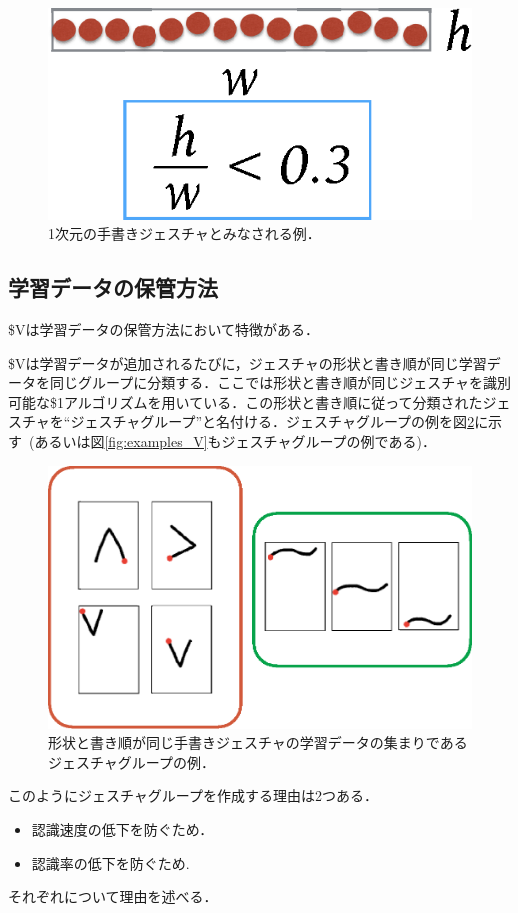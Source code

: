 \begin{figure} [h!]
	\begin{center}
		\includegraphics [width=0.3\hsize ]{img/1D.eps}
	\end{center}
	\caption{1次元の手書きジェスチャとみなされる例．}
	\label{fig:1D}
\end{figure}


\subsection{学習データの保管方法}
\$Vは学習データの保管方法において特徴がある．

\$Vは学習データが追加されるたびに，ジェスチャの形状と書き順が同じ学習データを同じグループに分類する．ここでは形状と書き順が同じジェスチャを識別可能な\$1アルゴリズムを用いている．この形状と書き順に従って分類されたジェスチャを``ジェスチャグループ''と名付ける．ジェスチャグループの例を図\ref{fig:gesture_group}に示す~(あるいは図\ref{fig:examples_V}もジェスチャグループの例である)．

\begin{figure} [h!]
	\begin{center}
		\includegraphics [width=0.55\hsize ]{img/gesture_group.eps}
	\end{center}
	\caption{形状と書き順が同じ手書きジェスチャの学習データの集まりであるジェスチャグループの例．}
	\label{fig:gesture_group}
\end{figure}

このようにジェスチャグループを作成する理由は2つある．
\begin{itemize}
\item 認識速度の低下を防ぐため．
\item 認識率の低下を防ぐため.
\end{itemize}
それぞれについて理由を述べる．


